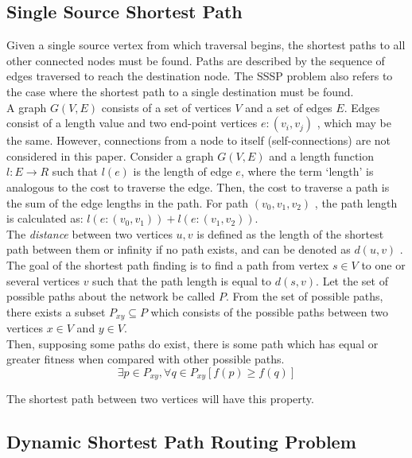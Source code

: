 \documentclass[
	a4paper, %
	10pt, %
	unnumberedsections, %
	twoside, %
]{LTJournalArticle}
\begin{document}
\subsection{Single Source Shortest Path}

Given a single source vertex from which traversal begins, the shortest paths to all other connected nodes must be found. Paths are described by the sequence of edges traversed to reach the destination node. The SSSP problem also refers to the case where the shortest path to a single destination must be found. \\

A graph \(G(V, E)\) consists of a set of vertices \( V \) and a set of edges \( E \). Edges consist of a length value and two end-point vertices \( e: (v_{i}, v_{j}) \) , which may be the same. However, connections from a node to itself (self-connections) are not considered in this paper. Consider a graph \( G(V, E) \) and a length function \( l: E \rightarrow R \) such that \(l(e)\) is the length of edge \(e\), where the term `length' is analogous to the cost to traverse the edge. Then, the cost to traverse a path is the sum of the edge lengths in the path. For path \( (v_{0}, v_{1}, v_{2}) \) , the path length is calculated as: \( l(e: (v_{0}, v_{1})) + l(e: (v_{1}, v_{2})) \). \\

The \emph{distance} between two vertices \(u, v\) is defined as the length of the shortest path between them or infinity if no path exists, and can be denoted as \( d(u, v) \)  \cite{even:12}. 
The goal of the shortest path finding is to find a path from vertex \( s \in V \) to one or several vertices \( v \) such that the path length is equal to \( d(s, v) \). Let the set of possible paths about the network be called \( P \). From the set of possible paths, there exists a subset \( P_{xy} \subseteq P \) which consists of the possible paths between two vertices \(x \in V\) and \(y \in V \). \\

Then, supposing some paths do exist, there is some path which has equal or greater fitness when compared with other possible paths. 
\begin{equation}
	\exists{p} \in P_{xy}, \forall{q} \in P_{xy} [f(p) \geq f(q)]
	\label{eq:exists_sp}
\end{equation}

The shortest path between two vertices will have this property. 

\subsection{Dynamic Shortest Path Routing Problem}
\end{document}
